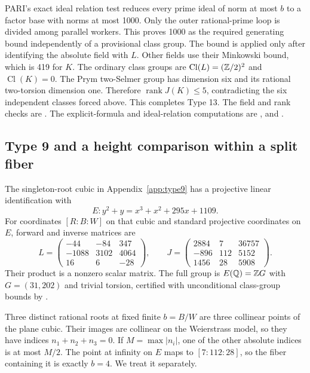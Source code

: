 PARI's exact ideal relation test reduces every prime ideal of norm
at most $b$ to a factor base with norms at most 1000. Only the
outer rational-prime loop is divided among parallel workers. This
proves 1000 as the required generating bound independently of a
provisional class group. The bound is applied only after identifying
the absolute field with $L$. Other fields use their Minkowski bound,
which is 419 for $K$. The ordinary class groups are
$\operatorname{Cl}(L)=(\mathbb Z/2)^2$ and
$\operatorname{Cl}(K)=0$. The Prym two-Selmer group has dimension
six and its rational two-torsion dimension one. Therefore
$\operatorname{rank}J(K)\leq5$, contradicting the six independent
classes forced above. This completes Type 13.
The field and rank checks are .
The explicit-formula and ideal-relation computations are
,
 and
.

\subsection{Type 9 and a height comparison within a split fiber}\label{app:type9-details}

The singleton-root cubic in Appendix~\ref{app:type9} has a projective
linear identification with
\[
 E:y^2+y=x^3+x^2+295x+1109.
\]
For coordinates $[R:B:W]$ on that cubic and standard projective
coordinates on $E$, forward and inverse matrices are
\[
 L=\begin{pmatrix}-44&-84&347\\-1088&3102&4064\\16&6&-28\end{pmatrix},
 \qquad J=\begin{pmatrix}2884&7&36757\\-896&112&5152\\1456&28&5908\end{pmatrix}.
\]
Their product is a nonzero scalar matrix. The full group is
$E(\mathbb Q)=\mathbb Z G$ with $G=(31,202)$ and trivial torsion,
certified with unconditional class-group bounds by
.

Three distinct rational roots at fixed finite $b=B/W$ are three
collinear points of the plane cubic. Their images are collinear on
the Weierstrass model, so they have indices $n_1+n_2+n_3=0$.
If $M=\max|n_i|$, one of the other absolute indices is at most
$M/2$. The point at infinity on $E$ maps to $[7:112:28]$, so the
fiber containing it is exactly $b=4$. We treat it separately.

